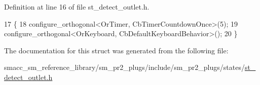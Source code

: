 Definition at line 16 of file st\+\_\+detect\+\_\+outlet.\+h.


\begin{DoxyCode}
17     \{
18         configure\_orthogonal<OrTimer,  CbTimerCountdownOnce>(5);    
19         configure\_orthogonal<OrKeyboard, CbDefaultKeyboardBehavior>();
20     \}
\end{DoxyCode}


The documentation for this struct was generated from the following file\+:\begin{DoxyCompactItemize}
\item 
smacc\+\_\+sm\+\_\+reference\+\_\+library/sm\+\_\+pr2\+\_\+plugs/include/sm\+\_\+pr2\+\_\+plugs/states/\hyperlink{st__detect__outlet_8h}{st\+\_\+detect\+\_\+outlet.\+h}\end{DoxyCompactItemize}
